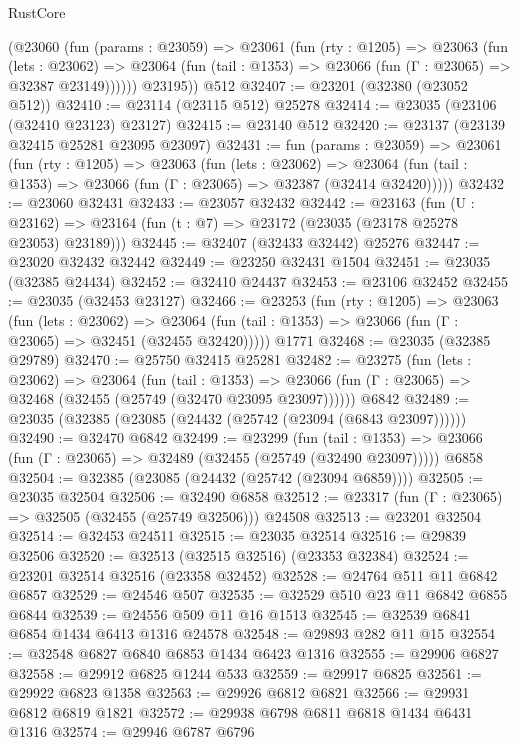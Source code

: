 \begin{lexlean}{RustCore}
\begin{coremodule}
        (@23060
          (fun (params : @23059) =>
          @23061
            (fun (rty : @1205) =>
            @23063
              (fun (lets : @23062) =>
              @23064 (fun (tail : @1353) => @23066 (fun (Γ : @23065) => @32387 @23149))))))
        @23195))
    @512
@32407 := @23201 (@32380 (@23052 @512))
@32410 := @23114 (@23115 @512) @25278
@32414 := @23035 (@23106 (@32410 @23123) @23127)
@32415 := @23140 @512
@32420 := @23137 (@23139 @32415 @25281 @23095 @23097)
@32431 := fun (params : @23059) =>
  @23061
    (fun (rty : @1205) =>
    @23063
      (fun (lets : @23062) =>
      @23064 (fun (tail : @1353) => @23066 (fun (Γ : @23065) => @32387 (@32414 @32420)))))
@32432 := @23060 @32431
@32433 := @23057 @32432
@32442 := @23163
    (fun (U : @23162) => @23164 (fun (t : @7) => @23172 (@23035 (@23178 @25278 @23053) @23189)))
@32445 := @32407 (@32433 @32442) @25276
@32447 := @23020 @32432 @32442
@32449 := @23250 @32431 @1504
@32451 := @23035 (@32385 @24434)
@32452 := @32410 @24437
@32453 := @23106 @32452
@32455 := @23035 (@32453 @23127)
@32466 := @23253
    (fun (rty : @1205) =>
    @23063
      (fun (lets : @23062) =>
      @23064 (fun (tail : @1353) => @23066 (fun (Γ : @23065) => @32451 (@32455 @32420)))))
    @1771
@32468 := @23035 (@32385 @29789)
@32470 := @25750 @32415 @25281
@32482 := @23275
    (fun (lets : @23062) =>
    @23064
      (fun (tail : @1353) =>
      @23066 (fun (Γ : @23065) => @32468 (@32455 (@25749 (@32470 @23095 @23097))))))
    @6842
@32489 := @23035 (@32385 (@23085 (@24432 (@25742 (@23094 (@6843 @23097))))))
@32490 := @32470 @6842
@32499 := @23299
    (fun (tail : @1353) => @23066 (fun (Γ : @23065) => @32489 (@32455 (@25749 (@32490 @23097)))))
    @6858
@32504 := @32385 (@23085 (@24432 (@25742 (@23094 @6859))))
@32505 := @23035 @32504
@32506 := @32490 @6858
@32512 := @23317 (fun (Γ : @23065) => @32505 (@32455 (@25749 @32506))) @24508
@32513 := @23201 @32504
@32514 := @32453 @24511
@32515 := @23035 @32514
@32516 := @29839 @32506
@32520 := @32513 (@32515 @32516) (@23353 @32384)
@32524 := @23201 @32514 @32516 (@23358 @32452)
@32528 := @24764 @511 @11 @6842 @6857
@32529 := @24546 @507
@32535 := @32529 @510 @23 @11 @6842 @6855 @6844
@32539 := @24556 @509 @11 @16 @1513
@32545 := @32539 @6841 @6854 @1434 @6413 @1316 @24578
@32548 := @29893 @282 @11 @15
@32554 := @32548 @6827 @6840 @6853 @1434 @6423 @1316
@32555 := @29906 @6827
@32558 := @29912 @6825 @1244 @533
@32559 := @29917 @6825
@32561 := @29922 @6823 @1358
@32563 := @29926 @6812 @6821
@32566 := @29931 @6812 @6819 @1821
@32572 := @29938 @6798 @6811 @6818 @1434 @6431 @1316
@32574 := @29946 @6787 @6796

\end{coremodule}
\end{lexlean}
